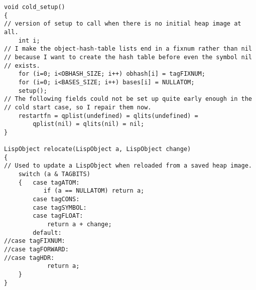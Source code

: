 {\begin{verbatim}
void cold_setup()
{
// version of setup to call when there is no initial heap image at all.
    int i;
// I make the object-hash-table lists end in a fixnum rather than nil
// because I want to create the hash table before even the symbol nil
// exists.
    for (i=0; i<OBHASH_SIZE; i++) obhash[i] = tagFIXNUM;
    for (i=0; i<BASES_SIZE; i++) bases[i] = NULLATOM;
    setup();
// The following fields could not be set up quite early enough in the
// cold start case, so I repair them now.
    restartfn = qplist(undefined) = qlits(undefined) =
        qplist(nil) = qlits(nil) = nil;
}

LispObject relocate(LispObject a, LispObject change)
{
// Used to update a LispObject when reloaded from a saved heap image.
    switch (a & TAGBITS)
    {   case tagATOM:
           if (a == NULLATOM) return a;
        case tagCONS:
        case tagSYMBOL:
        case tagFLOAT:
            return a + change;
        default:
//case tagFIXNUM:
//case tagFORWARD:
//case tagHDR:
            return a;
    }
}


\end{verbatim}}
